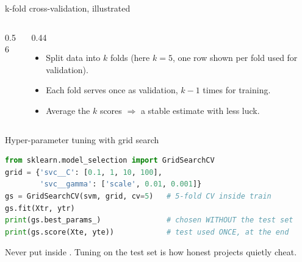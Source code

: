 \documentclass[10pt,aspectratio=169]{beamer}
\begin{document}
\begin{frame}{k-fold cross-validation, illustrated}
  \begin{columns}[T]
    \begin{column}{0.56\textwidth}
      \begin{center}
      \end{center}
    \end{column}
    \begin{column}{0.44\textwidth}
      \begin{itemize}
        \item Split data into $k$ folds (here $k{=}5$, one row shown per fold used for validation).
        \item Each fold serves once as validation, $k{-}1$ times for training.
        \item Average the $k$ scores $\Rightarrow$ a stable estimate with less luck.
      \end{itemize}
    \end{column}
  \end{columns}
\end{frame}

\begin{frame}[fragile]{Hyper-parameter tuning with grid search}
\begin{lstlisting}[language=Python]
from sklearn.model_selection import GridSearchCV
grid = {'svc__C': [0.1, 1, 10, 100],
        'svc__gamma': ['scale', 0.01, 0.001]}
gs = GridSearchCV(svm, grid, cv=5)   # 5-fold CV inside train
gs.fit(Xtr, ytr)
print(gs.best_params_)               # chosen WITHOUT the test set
print(gs.score(Xte, yte))            # test used ONCE, at the end
\end{lstlisting}
  \begin{badbox}
    Never put  inside . Tuning on the test set is how honest projects quietly cheat.
  \end{badbox}
\end{frame}
\end{document}
